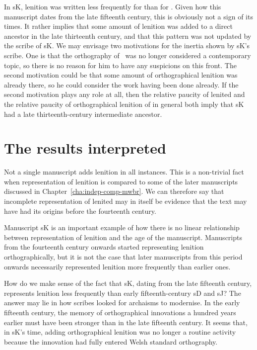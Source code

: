 In \gls{sK}, lenition was written less frequently for  than for . Given how this manuscript dates from the late fifteenth century, this is obviously not a sign of its times. It rather implies that some amount of lenition was added to a direct ancestor in the late thirteenth century, and that this pattern was not updated by the scribe of \gls{sK}. We may envisage two motivations for the inertia shown by \gls{sK}'s scribe. One is that the orthography of \lT\ was no longer considered a contemporary topic, so there is no reason for him to have any suspicions on this front. The second motivation could be that some amount of orthographical lenition was already there, so he could consider the work having been done already. If the second motivation plays any role at all, then the relative paucity of lenited  and the relative paucity of orthographical lenition of  in general both imply that \gls{sK} had a late thirteenth-century intermediate ancestor.

\section{The results interpreted}
\label{sec:interm-concl}
Not a single manuscript adds lenition in all instances. This is a non-trivial fact when representation of lenition is compared to some of the later  manuscripts discussed in Chapter~\ref{cha:indep-comp-mwbr}. We can therefore say that incomplete representation of lenited  may in itself be evidence that the text may have had its origins before the fourteenth century.

Manuscript \gls{sK} is an important example of how there is no linear relationship between representation of lenition and the age of the manuscript. Manuscripts from the fourteenth century onwards started representing lenition orthographically, but it is not the case that later manuscripts from this period onwards necessarily represented lenition more frequently than earlier ones.
  
How do we make sense of the fact that \gls{sK}, dating from the late fifteenth century, represents lenition less frequently than early fifteenth-century \gls{sD} and \gls{sJ}? The answer may lie in how scribes looked for archaisms to modernise. In the early fifteenth century, the memory of orthographical innovations a hundred years earlier must have been stronger than in the late fifteenth century. It seems that, in \gls{sK}'s time, adding orthographical lenition was no longer a routine activity because the innovation had fully entered Welsh standard orthography.

